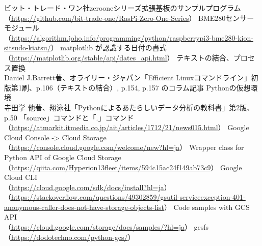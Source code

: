 \documentclass[12pt,a4j]{jsbook}
\begin{document}
\begin{thebibliography}{99}
	 ビット・トレード・ワン社zerooneシリーズ拡張基板のサンプルプログラム\\
	（\url{https://github.com/bit-trade-one/RasPi-Zero-One-Series}）
	 BME280センサーモジュール\\
	（\url{https://algorithm.joho.info/programming/python/raspberrypi3-bme280-kion-sitsudo-kiatsu/}）
	 matplotlib が認識する日付の書式\\
	（\url{https://matplotlib.org/stable/api/dates_api.html}）
	 テキストの結合、プロセス置換\\
	Daniel J.Barrett著、オライリー・ジャパン「Efficient Linuxコマンドライン」初版第1刷、p.106（テキストの結合）, p.154, p.157 のコラム記事
	 Pythonの仮想環境\\
	寺田学 他著、翔泳社「Pythonによるあたらしいデータ分析の教科書」第2版、p.50
	 「source」コマンドと「.」コマンド\\
	（\url{https://atmarkit.itmedia.co.jp/ait/articles/1712/21/news015.html}）
	 Google Cloud Console -> Cloud Storage\\
	（\url{https://console.cloud.google.com/welcome/new?hl=ja}）
	 Wrapper class for Python API of Google Cloud Storage\\
	（\url{https://qiita.com/Hyperion13fleet/items/594c15ac24f149ab73c9}）
	 Google Cloud CLI\\
	（\url{https://cloud.google.com/sdk/docs/install?hl=ja}）\\
	（\url{https://stackoverflow.com/questions/49302859/gsutil-serviceexception-401-anonymous-caller-does-not-have-storage-objects-list}）
	 Code samples with GCS API\\
	（\url{https://cloud.google.com/storage/docs/samples/?hl=ja}）
	 gcsfs
	（\url{https://dodotechno.com/python-gcs/}）
\end{thebibliography}
\end{document}
